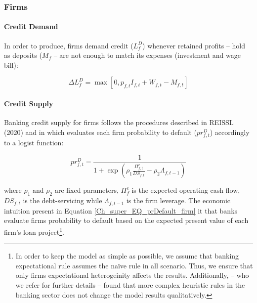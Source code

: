 \documentclass{SelfArx}
\begin{document}
\subsubsection{Firms}
\label{sec:orgf7c0392}
\paragraph*{Credit Demand}
\label{sec:orgce4fe4f}

In order to produce, firms demand credit (\(L_{f}^{D}\)) whenever retained profits -- hold as deposits (\(M_{f}\) -- are not enough to match its expenses (investment and wage bill):

\begin{latex}
\begin{equation}
\Delta L^{D}_{f} = \max [0, p_{f,t}I_{f,t} + W_{f,t} - M_{f,t}]
\end{equation}
\end{latex}
\paragraph*{Credit Supply}
\label{sec:org7915cdc}

Banking credit supply for firms follows the procedures described in REISSL (2020) and \textcite{pedrosa_2021_What} in which evaluates each firm probability to default (\(pr^{D}_{f,t}\)) accordingly to a logist function:

\begin{latex}
\begin{equation}
\label{Ch_super_EQ_prDefault_firm}
pr^{D}_{f,t} = \frac{1}{1 + \exp\left( \rho_{1}\frac{\Pi^{e}_{f,t}}{DS_{f,t}} - \rho_{2}\Lambda_{f,t-1} \right)}
\end{equation}
\end{latex}
where \(\rho_{1}\) and \(\rho_{2}\) are fixed parameters, \(\Pi^{e}_{f}\) is the expected operating cash flow, \(DS_{f,t}\) is the debt-servicing while \(\Lambda_{f,t-1}\) is the firm leverage.
The economic intuition present in Equation \ref{Ch_super_EQ_prDefault_firm} it that banks evaluate firms probability to default based on the expected present value of each firm's loan project\footnote{In order to keep the model as simple as possible, we assume that banking expectational rule assumes the naïve rule in all scenario. Thus, we ensure that only firms expectational heterogeinity affects the results. Additionally, \textcite{reissl_2021_Heterogeneousa} -- who we refer for further details --  found that more complex heuristic rules in the banking sector does not change the model results qualitatively.}.
\end{document}
